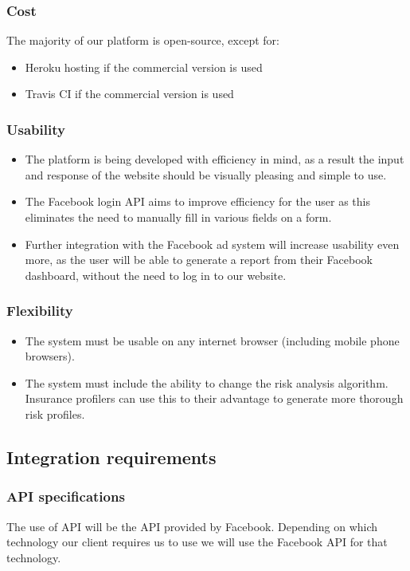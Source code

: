 \documentclass{article}
\begin{document}
		\subsubsection{Cost}
			The majority of our platform is open-source, except for:
		\begin{itemize}
			\item Heroku hosting if the commercial version is used
			\item Travis CI if the commercial version is used
		\end{itemize}

		\subsubsection{Usability}
		\begin{itemize}
			\item The platform is being developed with efficiency in mind, as a result the input and response of the website should be visually pleasing and simple to use.
			\item The Facebook login API aims to improve efficiency for the user as this eliminates the need to manually fill in various fields on a form.
			\item Further integration with the Facebook ad system will increase usability even more, as the user will be able to generate a report from their Facebook dashboard, without the need to log in to our website.
		\end{itemize}
		\subsubsection{Flexibility}
		\begin{itemize}
			\item The system must be usable on any internet browser (including mobile phone browsers). 
			\item The system must include the ability to change the risk analysis algorithm. Insurance profilers can use this to their advantage to generate more thorough risk profiles. 
		\end{itemize}
		
		 

	\subsection{Integration requirements}
		\subsubsection{API specifications}
			The use of API will be the API provided by Facebook. Depending on which technology our client requires us to use we will use the Facebook API for that technology.
\end{document}
